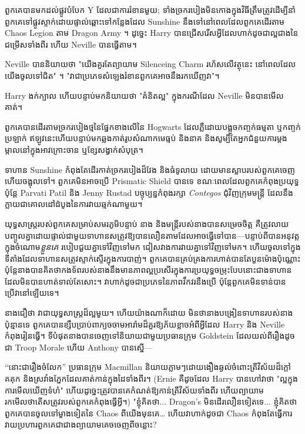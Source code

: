 ពួកគេបានមកដល់ផ្លូវបំបែក Y ដែលជាការរំខានមួយ; ទាំងច្រករបៀងមិនកោងក្នុងវិធីត្រឹមត្រូវដើម្បីនាំពួកគេទៅផ្លូវស្ទាក់ដោយផ្ទាល់ឆ្ពោះទៅកន្លែងដែល Sunshine នឹងទៅនៅពេលដែលពួកគេដើរតាម Chaos Legion តាម Dragon Army ។ ដូច្នេះ Harry បានជ្រើសរើសអ្វីដែលហាក់ដូចជាល្អជាងនៃជម្រើសទាំងពីរ ហើយ Neville បានធ្វើតាម។

Neville បាននិយាយថា "យើងគួរតែព្យាយាម Silenceing Charm រហ័សលើវត្ថុនេះ នៅពេលដែលយើងចូលទៅជិត" ។ "វា​ជា​ប្រភេទ​សំឡេង​រំខាន​ពួក​គេ​អាច​នឹង​រក​ឃើញ​វា"។

Harry ងក់ក្បាល ហើយបន្ទាប់មកនិយាយថា "គំនិតល្អ" ក្នុងករណីដែល Neville មិនបានមើលគាត់។

ពួកគេបានដើរតាមច្រករបៀងថ្មនៃផ្នែកខាងលើនៃ Hogwarts ដែលភ្លឺដោយបង្អួចកញ្ចក់ធម្មតា ឬកញ្ចក់ប្រឡាក់ ឥឡូវនេះហើយបន្ទាប់មកឆ្លងកាត់រូបសំណាកមេធ្មប់ និងនាគ និងសូម្បីតែអ្នកជំនួយការម្តងម្កាលនៅក្នុងអាវក្រោះចាន ឬខ្សែសង្វាក់សំបុត្រ។

\later

ទាហាន Sunshine កំពុងតែដើរកាត់ច្រករបៀងដ៏វែង និងធំទូលាយ ដោយមានស្លាបរបស់ពួកគេចេញ ហើយចង្អុលទៅ។ ពួកគេមិនអាចប្រើ Prismatic Shield បានទេ ខណៈពេលដែលពួកគេកំពុងប្រយុទ្ធ ប៉ុន្តែ Parvati Patil និង Jenny Rustad បច្ចុប្បន្នកំពុងរក្សា \emph{Contegos} ជុំវិញក្រុមមន្ត្រី ដែលនឹងក្លាយជាគោលដៅដំបូងនៃការវាយឆ្មក់ណាមួយ។

យុទ្ធសាស្ត្ររបស់ពួកគេសម្រាប់សមរភូមិបន្ទាប់ នាង និងមន្ត្រីរបស់នាងបានសម្រេចចិត្ត គឺត្រូវលាយបញ្ចូលគ្នាដោយផ្ទាល់ជាមួយទាហានសត្រូវឱ្យបានលឿនតាមដែលអាចធ្វើទៅបាន—បន្ទាប់ពីបានអនុវត្តក្នុងចំណោម\emph{ខ្លួនគេ} របៀបជួយគ្នាទៅវិញទៅមក ជៀសវាងការវាយគ្នាទៅវិញទៅមក។ ហើយចូលទៅក្នុងទីតាំងដែលទាហានសត្រូវស្ទាក់ស្ទើរក្នុងការបាញ់។ ពួកគេ​បាន​គ្រប់គ្រង​ការ​ហាត់​បាន​តែ​បួន​ម៉ោង​ប៉ុណ្ណោះ ប៉ុន្តែ​នាង​បាន​គិត​ថា​កងទ័ព​របស់​នាង​នឹង​មាន​ភាព​ល្អ​ប្រសើរ​ក្នុង​ការ​ប្រយុទ្ធ​ចម្រុះ​បែប​នោះ​ជាង​ទាហាន​ដែល​មិន​បាន​ហាត់​ទាល់​តែ​សោះ។ វាហាក់ដូចជាប្រភេទនៃភាពវឹកវរនឹងប្រើ ប៉ុន្តែពួកគេមិនទាន់បានប្រើវានៅឡើយទេ។

នាង​ជឿ​ថា វា​ជា​យុទ្ធសាស្ត្រ​ដ៏​ល្អ​មួយ។ ហើយយ៉ាងណាក៏ដោយ មិនថានាងបង្រៀនទាហានរបស់នាងប៉ុន្មានទេ ពួកគេបានខ្សឹបប្រាប់ពាក្យចចាមអារ៉ាមដ៏គួរឱ្យភ័យខ្លាចអំពីអ្វីដែល Harry និង Neville កំពុងរៀនធ្វើ។ ទីបំផុត​នាង​បាន​ចេញ​ទៅ​និយាយ​ជាមួយ​ប្រធាន​ក្រុម Goldstein ដែល​យល់​ពី​រឿង​ដូច​ជា Troop Morale ហើយ Anthony បាន​ស្នើ—

“នោះជារឿងចំលែក” ប្រធានក្រុម Macmillan និយាយភ្លាមៗដោយងឿងឆ្ងល់ចំពោះត្រីវិស័យដ៏ក្ដៅគគុក និងស្រវាំងភ្នែកដែលគាត់កាន់ក្នុងដៃទាំងពីរ។ (Ernie គឺដូចដែល Harry បានហៅវាថា "ល្អក្នុងការមើលឃើញទំហំ" ហើយដូច្នេះត្រូវបានគេកំណត់ឱ្យកាន់ត្រីវិស័យទាំងពីរ ហើយព្យាយាមរកមើលថាតើសត្រូវរបស់ពួកគេកំពុងធ្វើអ្វី។) "ខ្ញុំគិតថា... Dragon's មិនដើរលឿនទៀតទេ... ខ្ញុំ​គិត​ថា​ពួកគេ​បាន​ចូល​ទៅ​ម្ខាង​ទៀត​នៃ Chaos ពី​យើង​មុន​គេ… ហើយ​វា​ហាក់​ដូច​ជា Chaos កំពុង​តែ​ធ្វើ​ការ​វាយ​ប្រហារ​ពួក​គេ​ជាជាង​ព្យាយាម​គេច​ចេញ​ពី​ចន្លោះ?

